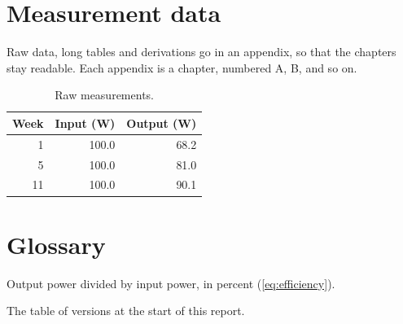 \chapter{Measurement data}
\label{app:data}
Raw data, long tables and derivations go in an appendix, so that the chapters stay readable.
Each appendix is a chapter, numbered A, B, and so on.

\begin{table}[ht]
  \centering
  \caption{Raw measurements.}
  \label{tab:raw}
  \begin{tabular}{@{}rrr@{}}
    \toprule
    Week & Input (W) & Output (W) \\
    \midrule
    1  & 100.0 & 68.2 \\
    5  & 100.0 & 81.0 \\
    11 & 100.0 & 90.1 \\
    \bottomrule
  \end{tabular}
\end{table}

\chapter{Glossary}
\label{app:glossary}
\begin{description}[style=nextline]
  \item[Efficiency] Output power divided by input power, in percent (\cref{eq:efficiency}).
  \item[Revision history] The table of versions at the start of this report.
\end{description}
